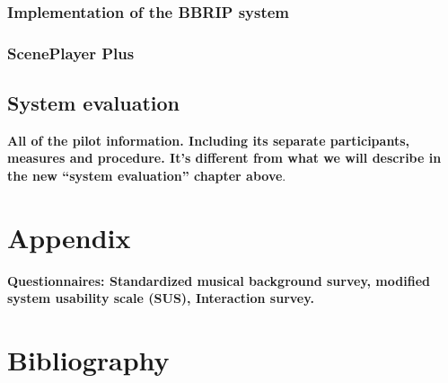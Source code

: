 \documentclass[a4paper,11pt]{article}
\begin{document}
\subsubsection{Implementation of the BBRIP system}


\subsubsection{ScenePlayer Plus}


\subsection{System evaluation}


\textbf{All of the pilot information. Including its separate participants, measures and procedure. It's different from what we will describe in the new ``system evaluation'' chapter above}.\\


\section{Appendix}


\textbf{Questionnaires: Standardized musical background survey, modified system usability scale (SUS), Interaction survey.}\\


\section{Bibliography}
\end{document}
